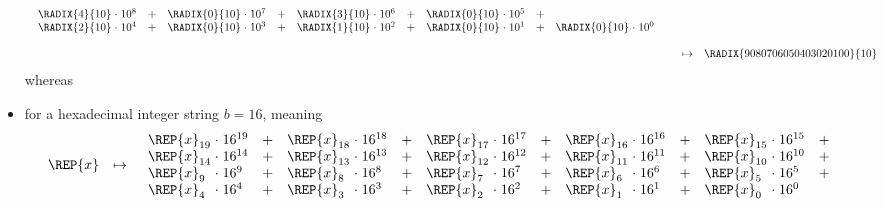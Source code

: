 \begin{itemize}
\[\begin{array}{lcl}
\begin{array}{*{5}{l@{\;}c@{\;}lc}}
                        \RADIX{4}{10} &\cdot& 10^{ 8} &+&
                        \RADIX{0}{10} &\cdot& 10^{ 7} &+&
                        \RADIX{3}{10} &\cdot& 10^{ 6} &+&
                        \RADIX{0}{10} &\cdot& 10^{ 5} &+\\
                        \RADIX{2}{10} &\cdot& 10^{ 4} &+&
                        \RADIX{0}{10} &\cdot& 10^{ 3} &+&
                        \RADIX{1}{10} &\cdot& 10^{ 2} &+&
                        \RADIX{0}{10} &\cdot& 10^{ 1} &+&
                        \RADIX{0}{10} &\cdot& 10^{ 0} & \\
                        \end{array}                     \\\\
              &\mapsto& \RADIX{9080706050403020100}{10}
      \end{array}
      \]
      whereas
\item for a hexadecimal integer string $b=16$, meaning
      \[
      \begin{array}{lcl}
      \REP{x} &\mapsto& \begin{array}{*{5}{l@{\;}c@{\;}lc}}
                        \REP{x}_{19}  &\cdot& 16^{19} &+&
                        \REP{x}_{18}  &\cdot& 16^{18} &+&
                        \REP{x}_{17}  &\cdot& 16^{17} &+&
                        \REP{x}_{16}  &\cdot& 16^{16} &+&
                        \REP{x}_{15}  &\cdot& 16^{15} &+\\
                        \REP{x}_{14}  &\cdot& 16^{14} &+&
                        \REP{x}_{13}  &\cdot& 16^{13} &+&
                        \REP{x}_{12}  &\cdot& 16^{12} &+&
                        \REP{x}_{11}  &\cdot& 16^{11} &+&
                        \REP{x}_{10}  &\cdot& 16^{10} &+\\
                        \REP{x}_{ 9}  &\cdot& 16^{ 9} &+&
                        \REP{x}_{ 8}  &\cdot& 16^{ 8} &+&
                        \REP{x}_{ 7}  &\cdot& 16^{ 7} &+&
                        \REP{x}_{ 6}  &\cdot& 16^{ 6} &+&
                        \REP{x}_{ 5}  &\cdot& 16^{ 5} &+\\
                        \REP{x}_{ 4}  &\cdot& 16^{ 4} &+&
                        \REP{x}_{ 3}  &\cdot& 16^{ 3} &+&
                        \REP{x}_{ 2}  &\cdot& 16^{ 2} &+&
                        \REP{x}_{ 1}  &\cdot& 16^{ 1} &+&
                        \REP{x}_{ 0}  &\cdot& 16^{ 0} & \\
                        \end{array}                     \\\\

\end{array}\]
\end{itemize}
